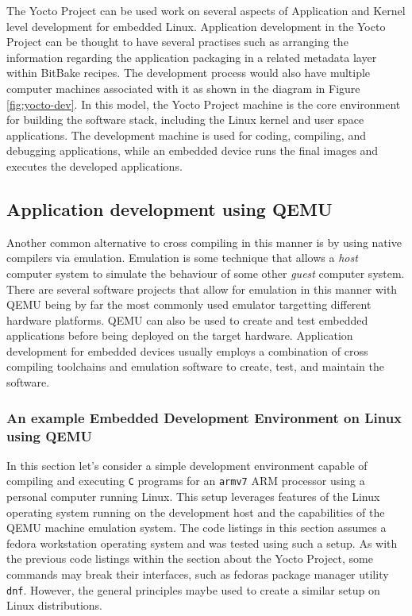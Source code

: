 The Yocto Project can be used work on several aspects of Application and Kernel level development for embedded Linux. Application development in the Yocto Project can be thought to have several practises such as arranging the information regarding the application packaging in a related metadata layer within BitBake recipes. The development process would also have multiple computer machines associated with it as shown in the diagram in Figure \ref{fig:yocto-dev}. In this model, the Yocto Project machine is the core environment for building the software stack, including the Linux kernel and user space applications. The development machine is used for coding, compiling, and debugging applications, while an embedded device runs the final images and executes the developed applications.

\subsection{Application development using QEMU}

Another common alternative to cross compiling in this manner is by using native compilers via emulation. Emulation is some technique that allows a \textit{host} computer system to simulate the behaviour of some other \textit{guest} computer system. There are several software projects that allow for emulation in this manner with QEMU being by far the most commonly used emulator targetting different hardware platforms. QEMU can also be used to create and test embedded applications before being deployed on the target hardware. Application development for embedded devices usually employs a combination of cross compiling toolchains and emulation software to create, test, and maintain the software.

\subsubsection{An example Embedded Development Environment on Linux using QEMU}

In this section let's consider a simple development environment capable of compiling and executing \texttt{C} programs for an \texttt{armv7} ARM processor using a personal computer running Linux. This setup leverages features of the Linux operating system running on the development host and the capabilities of the QEMU machine emulation system. The code listings in this section assumes a fedora workstation operating system and was tested using such a setup. As with the previous code listings within the section about the Yocto Project, some commands may break their interfaces, such as fedora\textquotesingle s package manager utility \texttt{dnf}. However, the general principles maybe used to create a similar setup on Linux distributions.

